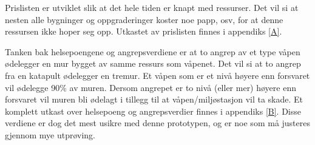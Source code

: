 Prislisten er utviklet slik at det hele tiden er knapt med ressurser. Det vil si at nesten alle bygninger og oppgraderinger koster noe papp, osv, for at denne ressursen ikke hoper seg opp. Utkastet av prislisten finnes i appendiks \ref{A}.

Tanken bak helsepoengene og angrepsverdiene er at to angrep av et type våpen ødelegger en mur bygget av samme ressurs som våpenet. Det vil si at to angrep fra en katapult ødelegger en tremur. Et våpen som er et nivå høyere enn forsvaret vil ødelegge 90\% av muren. Dersom angrepet er to nivå (eller mer) høyere enn forsvaret vil muren bli ødelagt i tillegg til at våpen/miljøstasjon vil ta skade. Et komplett utkast over helsepoeng og angrepsverdier finnes i appendiks \ref{B}. Disse verdiene er dog det mest usikre med denne prototypen, og er noe som må justeres gjennom mye utprøving.

